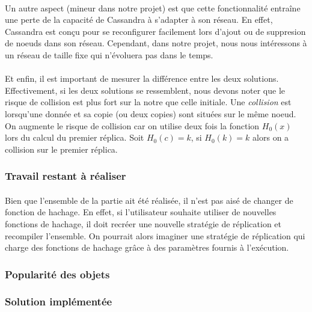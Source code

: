 \documentclass[12pt]{article}
\begin{document}
\paragraph{}Un autre aspect (mineur dans notre projet) est que cette fonctionnalité entraîne une perte de la capacité de Cassandra à s'adapter à son réseau. En effet, Cassandra est conçu pour se reconfigurer facilement lors d'ajout ou de suppresion de noeuds dans son réseau. Cependant, dans notre projet, nous nous intéressons à un réseau de taille fixe qui n'évoluera pas dans le temps.

\paragraph{}Et enfin, il est important de mesurer la différence entre les deux solutions. Effectivement, si les deux solutions se ressemblent, nous devons noter que le risque de collision est plus fort sur la notre que celle initiale. Une \textit{collision} est lorsqu'une donnée et sa copie (ou deux copies) sont situées sur le même noeud. On augmente le risque de collision car on utilise deux fois la fonction $ H_0 (x) $ lors du calcul du premier réplica. Soit $ H_0 (c) = k $, si $ H_0 (k) = k $ alors on a collision sur le premier réplica.

\subsubsection*{Travail restant à réaliser}

\paragraph{}Bien que l'ensemble de la partie ait été réalisée, il n'est pas aisé de changer de fonction de hachage. En effet, si l'utilisateur souhaite utiliser de nouvelles fonctions de hachage, il doit recréer une nouvelle stratégie de réplication et recompiler l'ensemble. On pourrait alors imaginer une stratégie de réplication qui charge des fonctions de hachage grâce à des paramètres fournis à l'exécution.

\subsubsection{Popularité des objets}

\subsubsection*{Solution implémentée}
\end{document}
